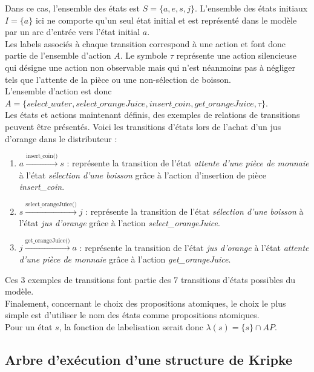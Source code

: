 \documentclass[runningheads,a4paper,10pt]{llncs}
\begin{document}
\noindent
Dans ce cas, l'ensemble des états est $S = \{a, e, s, j\}$. L'ensemble des états initiaux $I = \{a\}$ ici ne comporte qu'un seul état initial et est représenté dans le modèle par un arc d'entrée vers l'état initial $a$. \\

\noindent
Les labels associés à chaque transition correspond à une action et font donc partie de l'ensemble d'action $A$. Le symbole $\tau$ représente une action silencieuse qui désigne une action non observable mais qui n'est néanmoins pas à négliger tels que l'attente de la pièce ou une non-sélection de boisson. \\
L'ensemble d'action est donc $A = \{select\_water, select\_orangeJuice, insert\_coin, get\_orangeJuice, \tau\}$. \\

\noindent
Les états et actions maintenant définis, des exemples de relations de transitions peuvent être présentés. Voici les transitions d'états lors de l'achat d'un jus d'orange dans le distributeur : 

\begin{enumerate}
\item \boldmath$a \xrightarrow{\text{insert\_coin()}} s$ : représente la transition de l'état \textit{attente d'une pièce de monnaie} à l'état \textit{sélection d'une boisson} grâce à l'action d'insertion de pièce \textit{insert\_coin}. 
\item \boldmath$s \xrightarrow{\text{select\_orangeJuice()}} j$ : représente la transition de l'état \textit{sélection d'une boisson} à l'état \textit{jus d'orange} grâce à l'action \textit{select\_orangeJuice}. 
\item \boldmath$j \xrightarrow{\text{get\_orangeJuice()}} a$ : représente la transition de l'état \textit{jus d'orange} à l'état \textit{attente d'une pièce de monnaie} grâce à l'action \textit{get\_orangeJuice}.
\end{enumerate} 

Ces 3 exemples de transitions font partie des 7 transitions d'états possibles du modèle. \\

\noindent
Finalement, concernant le choix des propositions atomiques, le choix le plus simple est d'utiliser le nom des états comme propositions atomiques.\\
Pour un état $s$, la fonction de labelisation serait donc $\lambda(s) = \{s\} \cap AP$.  

\subsection{Arbre d'exécution d'une structure de Kripke}
\end{document}
